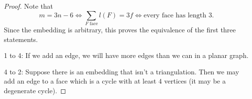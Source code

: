 \begin{proof}
  Note that
  \[
	m = 3n - 6 \iff \sum_{\text{$F$ face}} l(F) = 3f
	\iff \text{every face has length $3$}.
  \]
  Since the embedding is arbitrary, this proves the equivalence of the first
  three statements.

  1 to 4:
  If we add an edge, we will have more edges than we can in a planar graph.

  4 to 2:
  Suppose there is an embedding that isn't a triangulation.
  Then we may add an edge to a face which is a cycle with at least $4$ vertices
  (it may be a degenerate cycle).
\end{proof}


